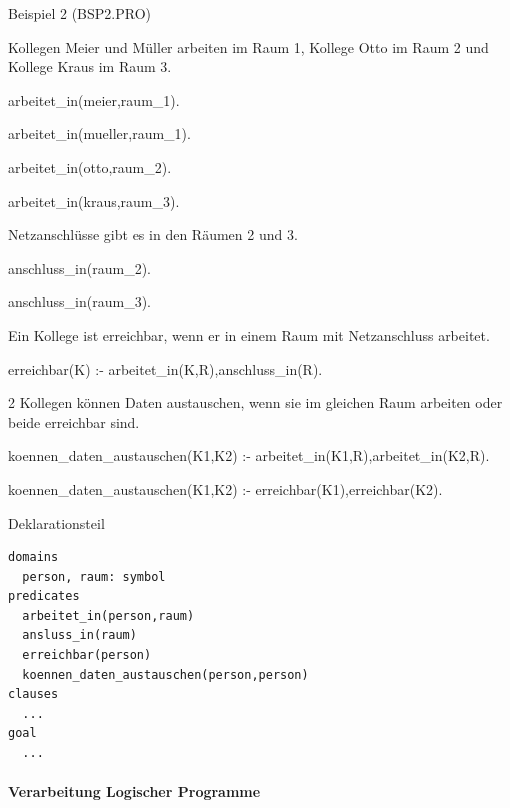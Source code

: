 \documentclass[a4paper]{article}
\begin{document}
\begin{multicols}{3}
  \begin{enumerate*}
    \setcounter{enumi}{1}
    \itemsep1pt\parskip0pt
    \item
          Beispiel 2 (BSP2.PRO)
  \end{enumerate*}

  \begin{itemize*}
    \itemsep1pt\parskip0pt
    \item
          Kollegen Meier und Müller arbeiten im Raum 1, Kollege Otto im Raum 2
          und Kollege Kraus im Raum 3.
    \item
          arbeitet\_in(meier,raum\_1).
    \item
          arbeitet\_in(mueller,raum\_1).
    \item
          arbeitet\_in(otto,raum\_2).
    \item
          arbeitet\_in(kraus,raum\_3).
    \item
          Netzanschlüsse gibt es in den Räumen 2 und 3.
    \item
          anschluss\_in(raum\_2).
    \item
          anschluss\_in(raum\_3).
    \item
          Ein Kollege ist erreichbar, wenn er in einem Raum mit Netzanschluss
          arbeitet.
    \item
          erreichbar(K) :- arbeitet\_in(K,R),anschluss\_in(R).
    \item
          2 Kollegen können Daten austauschen, wenn sie im gleichen Raum
          arbeiten oder beide erreichbar sind.
    \item
          koennen\_daten\_austauschen(K1,K2) :-
          arbeitet\_in(K1,R),arbeitet\_in(K2,R).
    \item
          koennen\_daten\_austauschen(K1,K2) :- erreichbar(K1),erreichbar(K2).
  \end{itemize*}

  Deklarationsteil

  \begin{verbatim}
domains
  person, raum: symbol
predicates
  arbeitet_in(person,raum)
  ansluss_in(raum)
  erreichbar(person)
  koennen_daten_austauschen(person,person)
clauses
  ...
goal
  ...
\end{verbatim}

  \paragraph{Verarbeitung Logischer
    Programme}\label{verarbeitung-logischer-programme}


\end{multicols}
\end{document}
